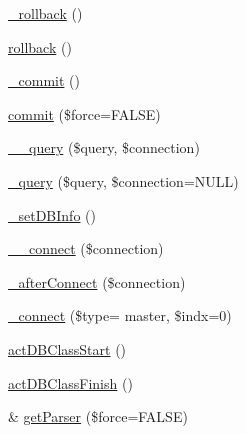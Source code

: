 \begin{DoxyCompactItemize}
\item 
\hyperlink{classDB_ac537ae2001731b709a4b60992b04275b}{\+\_\+rollback} ()
\item 
\hyperlink{classDB_a1fb6903379bc241fd318b980b9e30882}{rollback} ()
\item 
\hyperlink{classDB_ae6b44dc80d78b7f73cb6741ff0d63399}{\+\_\+commit} ()
\item 
\hyperlink{classDB_a9e84ef91b522b1cd4d1f0f9a3fe3a57a}{commit} (\$force=F\+A\+L\+S\+E)
\item 
\hyperlink{classDB_a9e93ad499d34fefc40686d35ed9bf18f}{\+\_\+\+\_\+query} (\$query, \$connection)
\item 
\hyperlink{classDB_a740ea0f536b5ffacabf31b3a7473f5a7}{\+\_\+query} (\$query, \$connection=N\+U\+L\+L)
\item 
\hyperlink{classDB_a92f2478aeb03b00432332ad4e4a3d700}{\+\_\+set\+D\+B\+Info} ()
\item 
\hyperlink{classDB_a398b5d8142cab5920d3e037b4f22830e}{\+\_\+\+\_\+connect} (\$connection)
\item 
\hyperlink{classDB_ae9511581ab1229970e061e599b0f2f94}{\+\_\+after\+Connect} (\$connection)
\item 
\hyperlink{classDB_aaa2d517ff3b233e36c7873f288cb38ba}{\+\_\+connect} (\$type= \textquotesingle{}master\textquotesingle{}, \$indx=0)
\item 
\hyperlink{classDB_a5aa10d0d5f40cbd7c9b20a84b1c1c307}{act\+D\+B\+Class\+Start} ()
\item 
\hyperlink{classDB_abcdbf61ef5e7c96725c7ea2781f165f4}{act\+D\+B\+Class\+Finish} ()
\item 
\& \hyperlink{classDB_ac1222f2e7a1aae0fcd7d9e906a7a96ba}{get\+Parser} (\$force=F\+A\+L\+S\+E)
\end{DoxyCompactItemize}
